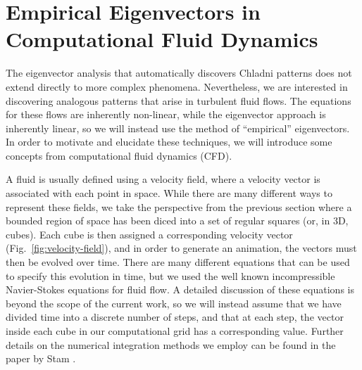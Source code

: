 \documentclass[11pt]{article}
\begin{document}
\section*{Empirical Eigenvectors in Computational Fluid Dynamics}

The eigenvector analysis that automatically discovers Chladni patterns does not extend directly to more complex phenomena. Nevertheless, we are interested in discovering analogous patterns that arise in turbulent fluid flows. The equations for these flows are inherently non-linear, while the eigenvector approach is inherently linear, so we will instead use the method of ``empirical'' eigenvectors. In order to motivate and elucidate these techniques, we will introduce some concepts from computational fluid dynamics (CFD).

A fluid is usually defined using a velocity field, where a velocity vector is associated with each point in space. While there are many different ways to represent these fields, we take the perspective from the previous section where a bounded region of space has been diced into a set of regular squares (or, in 3D, cubes). Each cube is then assigned a corresponding velocity vector (Fig.~\ref{fig:velocity-field}), and in order to generate an animation, the vectors must then be evolved over time. There are many different equations that can be used to specify this evolution in time, but we used the well known incompressible Navier-Stokes equations for fluid flow. A detailed discussion of these equations is beyond the scope of the current work, so we will instead assume that we have divided time into a discrete number of steps, and that at each step, the vector inside each cube in our computational grid has a corresponding value. Further details on the numerical integration methods we employ can be found in the paper by Stam \cite{Stam99}.

\end{document}
